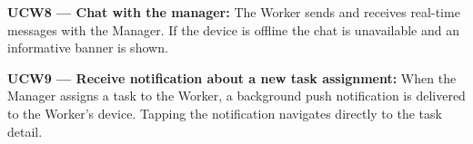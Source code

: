 \documentclass[12pt,a4paper]{article}
\begin{document}
\textbf{UCW8 --- Chat with the manager:} The Worker sends and receives real-time messages with the Manager. If the device is offline the chat is unavailable and an informative banner is shown.

\textbf{UCW9 --- Receive notification about a new task assignment:} When the Manager assigns a task to the Worker, a background push notification is delivered to the Worker's device. Tapping the notification navigates directly to the task detail.

\end{document}
